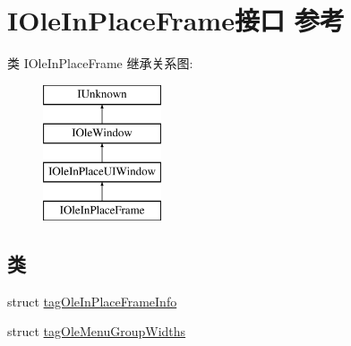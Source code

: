 \hypertarget{interface_i_ole_in_place_frame}{}\section{I\+Ole\+In\+Place\+Frame接口 参考}
\label{interface_i_ole_in_place_frame}
类 I\+Ole\+In\+Place\+Frame 继承关系图\+:\begin{figure}[H]
\begin{center}
\leavevmode
\includegraphics[height=4.000000cm]{interface_i_ole_in_place_frame}
\end{center}
\end{figure}
\subsection*{类}
\begin{DoxyCompactItemize}
\item 
struct \hyperlink{struct_i_ole_in_place_frame_1_1tag_ole_in_place_frame_info}{tag\+Ole\+In\+Place\+Frame\+Info}
\item 
struct \hyperlink{struct_i_ole_in_place_frame_1_1tag_ole_menu_group_widths}{tag\+Ole\+Menu\+Group\+Widths}
\end{DoxyCompactItemize}
